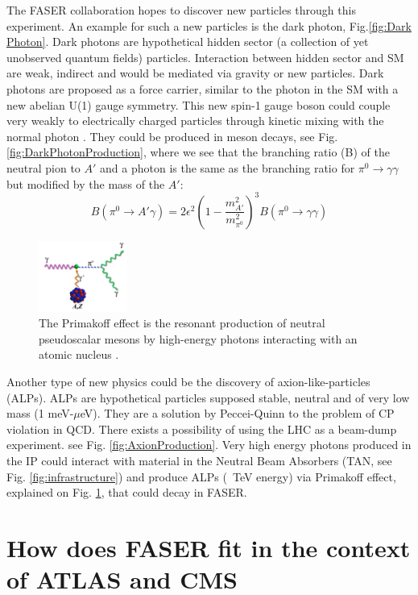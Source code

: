 The FASER collaboration hopes to discover new particles through this experiment. An example for such a new particles is the dark photon, Fig.\ref{fig:Dark Photon}. Dark photons are hypothetical hidden sector (a collection of yet unobserved quantum fields) particles. Interaction between hidden sector and SM are weak, indirect and would be mediated via gravity or new particles. Dark photons are proposed as a force carrier, similar to the photon in the SM with a new abelian U(1) gauge symmetry. This new spin-1 gauge boson could couple very weakly to electrically charged particles through kinetic mixing with the normal photon \cite{noauthor_dark_2019}.
They could be produced in meson decays, see Fig. \ref{fig:DarkPhotonProduction}, where we see that the branching ratio (B) of the neutral pion to $A'$ and a photon is the same as the branching ratio for $\pi^0 \rightarrow \gamma\gamma$ but modified by the mass of  the $A'$:
\[
B(\pi^0 \rightarrow A'\gamma)=2\epsilon^2\left( 1-\frac{m^2_{A'}}{m^2_{\pi^0}} \right)^3B(\pi^0 \rightarrow \gamma\gamma)
\]

\begin{figure}
  \centering
    \includegraphics[width=0.26\textwidth]{Primakoff.png}
    \caption[Primakoff Effect]{The Primakoff effect is the resonant production of neutral pseudoscalar mesons by high-energy photons interacting with an atomic nucleus \cite{kang_standard_1978}.}
    \label{fig:Primakoff}
\end{figure}

Another type of new physics could be the discovery of axion-like-particles (ALPs). ALPs are hypothetical particles supposed stable, neutral and of very low mass (1 meV-$\mu$eV). They are a solution by Peccei-Quinn to the problem of CP violation in QCD.
There exists a possibility of using the LHC as a beam-dump experiment. see Fig. \ref{fig:AxionProduction}. Very high energy photons produced in the IP could interact with material in the Neutral Beam Absorbers (TAN, see Fig. \ref{fig:infrastructure}) and produce ALPs (~TeV energy) via Primakoff effect, explained on Fig. \ref{fig:Primakoff}, that could decay in FASER.

\section{How does FASER fit in the context of ATLAS and CMS}

